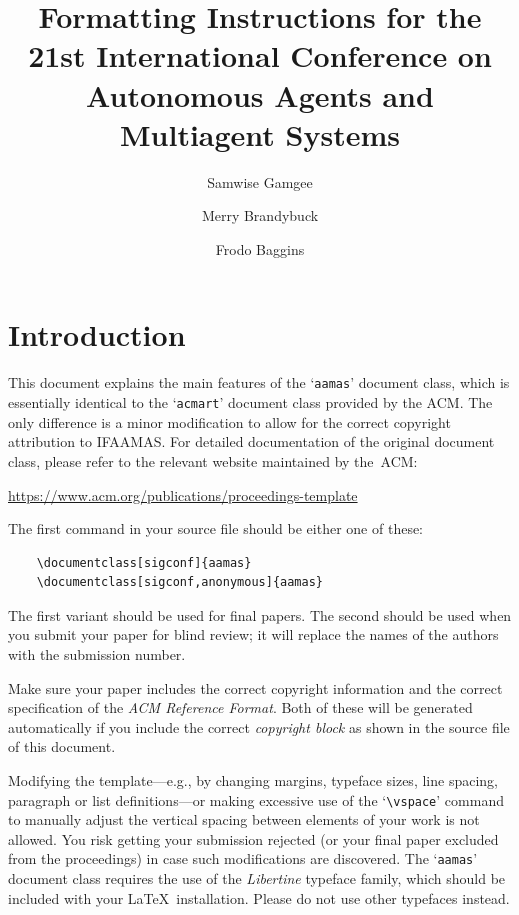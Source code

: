 \documentclass[sigconf]{aamas}
\title[AAMAS-2022 Formatting Instructions]{Formatting Instructions for the 21st International Conference on Autonomous Agents and Multiagent Systems}
\author{Samwise Gamgee}
\affiliation{
  \institution{Long Journey University}
  \city{Eriador}
  \country{New Zealand}}
\author{Merry Brandybuck}
\affiliation{
  \institution{The Ring Company Inc.}
  \city{Lindon}
  \state{The Great Land}
  \country{New Zealand}}
\author{Frodo Baggins}
\affiliation{
  \institution{Two Towers University}
  \city{Rohan}
  \country{New Zealand}}
\begin{document}

\pagestyle{fancy}
\fancyhead{}


\maketitle 


\section{Introduction}

This document explains the main features of the `\texttt{aamas}' 
document class, which is essentially identical to the `\texttt{acmart}'
document class provided by the ACM. The only difference is a minor 
modification to allow for the correct copyright attribution to IFAAMAS.
For detailed documentation of the original document class, please refer
to the relevant website maintained by the~ACM:
%
\begin{center}
\url{https://www.acm.org/publications/proceedings-template}
\end{center}
%
The first command in your source file should be either one of these:
\begin{verbatim}
    \documentclass[sigconf]{aamas}
    \documentclass[sigconf,anonymous]{aamas}
\end{verbatim}
%
The first variant should be used for final papers. The second should be
used when you submit your paper for blind review; it will replace the 
names of the authors with the submission number.

Make sure your paper includes the correct copyright information and 
the correct specification of the \emph{ACM Reference Format}. Both of 
these will be generated automatically if you include the correct 
\emph{copyright block} as shown in the source file of this document.

Modifying the template---e.g., by changing margins, typeface sizes, 
line spacing, paragraph or list definitions---or making excessive use 
of the `\verb|\vspace|' command to manually adjust the vertical spacing 
between elements of your work is not allowed. You risk getting your 
submission rejected (or your final paper excluded from the proceedings) 
in case such modifications are discovered. The `\texttt{aamas}' document 
class requires the use of the \textit{Libertine} typeface family, which 
should be included with your \LaTeX\ installation. Please do not use 
other typefaces instead.
\end{document}
